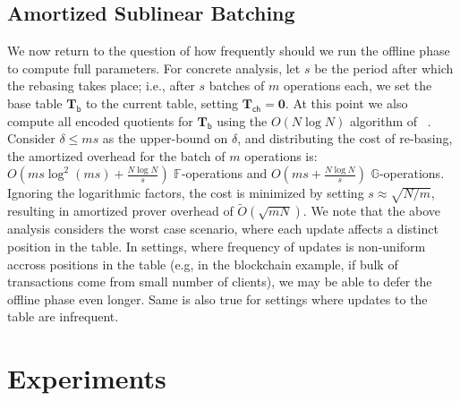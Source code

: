 \documentclass[sigconf]{acmart}
\renewcommand{\vec}{\mathbf} %
\newcommand{\vecTbase}{\vec{T}_{\mathsf{b}}}
\newcommand{\vecTcache}{\vec{T}_{\mathsf{ch}}}
\newcommand{\wt}[1]{\widetilde{#1}}
\providecommand{\DIFaddbegin}{} %
\providecommand{\DIFaddend}{} %
\newcommand{\DIFaddincludegraphics}[2][]{{\color{blue}\fbox{\DIFOincludegraphics[#1]{#2}}}} %
\DeclareRobustCommand{\DIFaddbegin}{\DIFOaddbegin \let\includegraphics\DIFaddincludegraphics} %
\DeclareRobustCommand{\DIFaddend}{\DIFOaddend \let\includegraphics\DIFOincludegraphics} %
\begin{document}
		\subsection{Amortized Sublinear Batching}\label{sec:amortization}
		We now return to the question of how frequently should we run the offline phase to compute full parameters.
		For concrete analysis, let $s$ be the period after which the rebasing takes place; i.e., after $s$ batches of $m$ operations
		each, we set the base table $\vecTbase$ to the current table, setting $\vecTcache=\vec{0}$. At this point we also compute all
		encoded quotients for $\vecTbase$ using the $O(N\log N)$ algorithm of ~\cite{EPRINT:FeiKho23}. Consider $\delta\leq ms$ as
		the upper-bound on $\delta$, and distributing the cost of re-basing, the amortized overhead for the batch of $m$ operations is:
		$O(ms \log^2(ms)+\frac{N\log N}{s})$ $\mathbb{F}$-operations and $O(ms +\frac{N\log N}{s})$ $\mathbb{G}$-operations. Ignoring
		the logarithmic factors, the cost is minimized by setting $s\approx \sqrt{N/m}$, resulting in amortized prover overhead of
		$\wt{O}(\sqrt{mN})$. We note that the above analysis considers the worst case scenario, where each update affects a distinct
		position in the table. In settings, where frequency of updates is non-uniform accross positions in the table (e.g, in the
		blockchain example, if bulk of transactions come from small number of clients), we may be able to defer the offline phase even longer.
		Same is also true for settings where updates to the table are infrequent.
		
%		
%		
		\section{Experiments}\label{sec:experiments}
		\DIFaddbegin 
		
		
		
		\DIFaddend 
		
\end{document}

